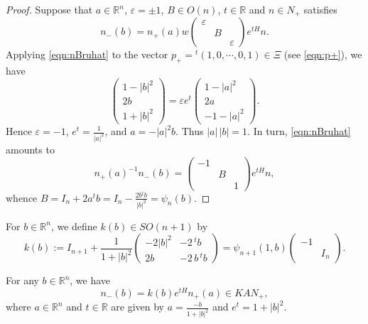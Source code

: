 \begin{proof}
Suppose that $a \in {\mathbb{R}}^n$, 
 $\varepsilon = \pm 1$, 
 $B \in O(n)$, 
 $t \in {\mathbb{R}}$
 and $n \in N_+$ satisfies
\begin{equation}
\label{eqn:nBruhat}
n_-(b)= n_+(a) w 
\begin{pmatrix} \varepsilon & & 
\\
                            & B & 
\\
                            & & \varepsilon
\end{pmatrix} e^{t H} n. 
\end{equation}
Applying \eqref{eqn:nBruhat}
 to the vector $p_+ ={}^{t\!}(1,0,\cdots,0,1)\in \Xi$
 (see \eqref{eqn:p+}),  
 we have
\[
\begin{pmatrix}
1-|b|^2
\\
2b
\\
1+ |b|^2
\end{pmatrix}
=
\varepsilon 
e^t
\begin{pmatrix}
1-|a|^2
\\
2a
\\
-1 - |a|^2
\end{pmatrix}.  
\]
Hence $\varepsilon =-1$, 
 $e^t=\frac{1}{|a|^2}$, 
 and $a = -|a|^2 b$.  
Thus $|a|\,|b|=1$.  
In turn, 
 \eqref{eqn:nBruhat} amounts to 
\[
 n_+(a)^{-1} n_-(b)
=
\begin{pmatrix} -1 & & 
\\
                            & B & 
\\
                            & & 1
\end{pmatrix} 
e^{t H} n, 
\]
whence 
$
  B = I_n + 2 a {}^{t\!}b
    = I_n - \frac{2 b {}^{t\!}b}{|b|^2}
    =\psi_n(b).  
$
\end{proof}
For $b \in {\mathbb{R}}^n$, 
 we define $k(b) \in SO(n+1)$ by 
\begin{equation}
\label{eqn:kb}
   k(b):=I_{n+1} + \frac{1}{1+|b|^2}
        \begin{pmatrix}
         -2 |b|^2 & -2\, {}^{t\!}b
         \\
         2 b   & -2\,b\,{}^{t\!}b
        \end{pmatrix}
       = \psi_{n+1}(1,b) \begin{pmatrix} -1 & \\ & I_n \end{pmatrix}.  
\end{equation}
\begin{lemma}
\label{lem:0.2}
For any $b \in {\mathbb{R}}^n$, 
 we have 
\begin{equation}
\label{eqn:nKAN}
   n_-(b)=k (b) e^{t H} n_+(a) 
\in KAN_+, 
\end{equation}
where $a \in {\mathbb{R}}^n$ 
 and $t \in {\mathbb{R}}$ are given by 
$
   a= \frac{-b}{1+|b|^2}
$
 and 
$
   e^t=1+|b|^2. 
$
\end{lemma}
